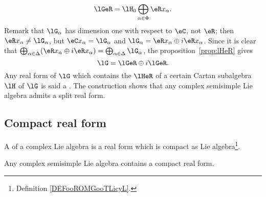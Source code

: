 \[
	\lGeR=\lH_0\bigoplus_{\alpha\in\Phi}\eR x_{\alpha}.
\]
Remark that $\lG_{\alpha}$ has dimension one with respect to $\eC$, not $\eR$; then $\eR x_{\alpha}\neq\lG_{\alpha}$, but $\eC x_{\alpha}=\lG_{\alpha}$ and $\lG_{\alpha}=\eR x_{\alpha}\oplus i\eR x_{\alpha}$. Since it is clear that $\bigoplus_{\alpha\in\Delta}( \eR x_{\alpha}\oplus i\eR x_{\alpha} )=\bigoplus_{\alpha\in\Delta}\lG_{\alpha}$, the proposition~\ref{prop:lHeR} gives
\begin{equation}
	\lG=\lGeR\oplus i\lGeR.
\end{equation}
Any real form of $\lG$ which contains the $\lHeR$ of a certain Cartan subalgebra $\lH$ of $\lG$ is said a . The construction shows that any complex semisimple Lie algebra admits a split real form.

\subsection{Compact real form}

\begin{definition}
	A  of a complex Lie algebra is a real form which is compact as Lie algebra\footnote{Definition \ref{DEFooROMGooTLicyL}.}.
\end{definition}

\begin{theorem}
	Any complex semisimple Lie algebra contains a compact real form.
\end{theorem}

